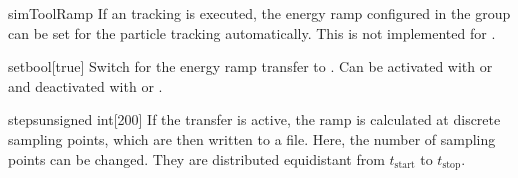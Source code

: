 \documentclass[a4paper]{scrartcl}
\begin{document}
\begin{configdocgroup}{simToolRamp}
  If an \ele tracking is executed, the energy ramp configured in the group
   can be set for the particle tracking automatically. This is
  not implemented for \madx.

  \begin{configdoc}{set}{bool}{}[true]
    Switch for the energy ramp transfer to \ele. Can be activated with  or
     and deactivated with  or .
  \end{configdoc}

  \begin{configdoc}{steps}{unsigned int}{}[200]
    If the transfer is active, the ramp is calculated at discrete sampling points, which
    are then written to a \sdds file. Here, the number of sampling points can be changed.
    They are distributed equidistant from $t_\text{start}$ to $t_\text{stop}$.
  \end{configdoc}
\end{configdocgroup}
\end{document}
